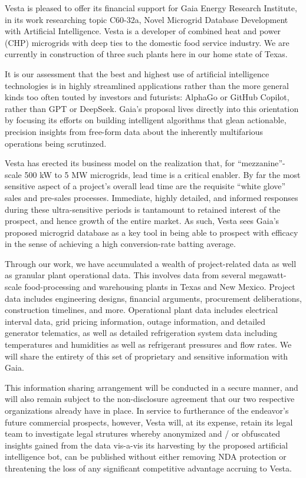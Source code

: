 \documentclass{vestaletter}
\def\Bidder{Gaia Energy Research Institute}
\def\BidderShort{Gaia}
\def\Topic{C60}
\def\Subtopic{32a}
\def\TopicDescription{Novel Microgrid Database Development with Artificial Intelligence}
\begin{document}
Vesta is pleased to offer its financial support for \Bidder, in its work researching topic \Topic-\Subtopic, \TopicDescription. Vesta is a developer of combined heat and power (CHP) microgrids with deep ties to the domestic food service industry. We are currently in construction of three such plants here in our home state of Texas.

It is our assessment that the best and highest use of artificial intelligence technologies is in highly streamlined applications rather than the more general kinds too often touted by investors and futurists: AlphaGo or GitHub Copilot, rather than GPT or DeepSeek. \BidderShort's proposal lives directly into this orientation by focusing its efforts on building intelligent algorithms that glean actionable, precision insights from free-form data about the inherently multifarious operations being scrutinzed. 

Vesta has erected its business model on the realization that, for ``mezzanine''-scale 500 kW to 5 MW microgrids, lead time is a critical enabler. By far the most sensitive aspect of a project's overall lead time are the requisite ``white glove'' sales and pre-sales processes. Immediate, highly detailed, and informed responses during these ultra-sensitive periods is tantamount to retained interest of the prospect, and hence growth of the entire market. As such, Vesta sees \BidderShort's proposed microgrid database as a key tool in being able to prospect with efficacy in the sense of achieving a high conversion-rate batting average.

Through our work, we have accumulated a wealth of project-related data as well as granular plant operational data. This involves data from several megawatt-scale food-processing and warehousing plants in Texas and New Mexico. Project data includes engineering designs, financial arguments, procurement deliberations, construction timelines, and more. Operational plant data includes electrical interval data, grid pricing information, outage information, and detailed generator telematics, as well as detailed refrigeration system data including temperatures and humidities as well as refrigerant pressures and flow rates. We will share the entirety of this set of proprietary and sensitive information with \BidderShort.

This information sharing arrangement will be conducted in a secure manner, and will also remain subject to the non-disclosure agreement that our two respective organizations already have in place. In service to furtherance of the endeavor's future commercial prospects, however, Vesta will, at its expense, retain its legal team to investigate legal strutures whereby anonymized and / or obfuscated insights gained from the data vis-a-vis its harvesting by the proposed artificial intelligence bot, can be published without either removing NDA protection or threatening the loss of any significant competitive advantage accruing to Vesta. 
\end{document}
